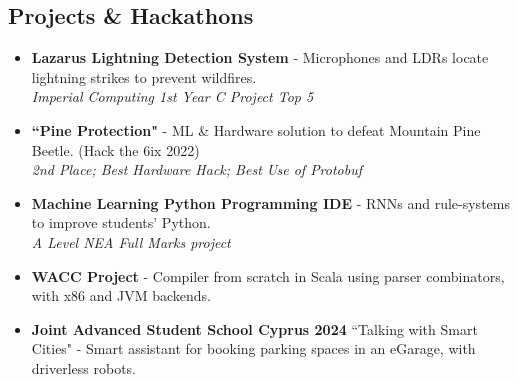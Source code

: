 \documentclass{Resume}
\begin{document}
		\subsection{Projects \& Hackathons}
			\begin{itemize}
   
            \item \textbf{Lazarus Lightning Detection System} - Microphones and LDRs locate lightning strikes to prevent wildfires.\\ \textit{Imperial Computing 1st Year C Project Top 5}
            
            \item \textbf{``Pine Protection"} - ML \& Hardware solution to defeat Mountain Pine Beetle. (Hack the 6ix 2022)\\ 
            \textit{2nd Place; Best Hardware Hack; Best Use of Protobuf}

            \item \textbf{Machine Learning Python Programming IDE} - RNNs and rule-systems to improve students' Python. \\ \textit{A Level NEA Full Marks project}

            \item \textbf{WACC Project} - Compiler from scratch in Scala using parser combinators, with x86 and JVM backends.

               \item \textbf{Joint Advanced Student School Cyprus 2024} ``Talking with Smart Cities" - Smart assistant for booking parking spaces in an eGarage, with driverless robots.               %

    
				
			\end{itemize}
    
\end{document}
